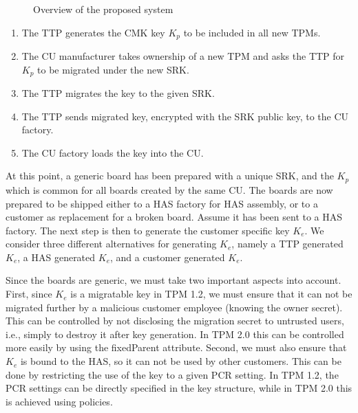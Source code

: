 {\begin{figure}[hbtp]
{
	}
	\caption{Overview of the proposed system}
	\label{fig:overviewDesign}
\end{figure}


\begin{enumerate}
\item The TTP generates the CMK key $K_{p}$ to be included in all new TPMs.  \label{item:genkp}
\item The CU manufacturer takes ownership of a new TPM and asks the TTP for $K_p$ to be migrated under the new SRK. \label{item:sendsrk}
\item The TTP migrates the key to the given SRK. \label{item:migratetocusrk}
\item The TTP sends migrated key, encrypted with the SRK public key, to the CU factory. \label{item:sendkp}
\item The CU factory loads the key into the CU. \label{item:culoadblob}
\end{enumerate}

At this point, a generic board has been prepared with a unique SRK, and the $K_p$ which is common for all boards created by the same CU.
The boards are now prepared to be shipped either to a HAS factory for HAS assembly, or to a customer as replacement for a broken board. Assume it has been sent to a HAS factory. The next step is then to generate the customer specific key $K_e$. We consider three different alternatives for generating $K_e$, namely a TTP generated $K_e$, a HAS generated $K_e$, and a customer generated $K_e$. 

Since the boards are generic, we must take two important aspects into account. First, since $K_e$ is a migratable key in TPM 1.2, we must ensure that it can not be migrated further by a malicious customer employee (knowing the owner secret). This can be controlled by not disclosing the migration secret to untrusted users, i.e., simply to destroy it after key generation. In TPM 2.0 this can be controlled more easily by using the fixedParent attribute. Second, we must also ensure that $K_e$ is bound to the HAS, so it can not be used by other customers. This can be done by restricting the use of the key to a given PCR setting. In TPM 1.2, the PCR settings can be directly specified in the key structure, while in TPM 2.0 this is achieved using policies.

}
